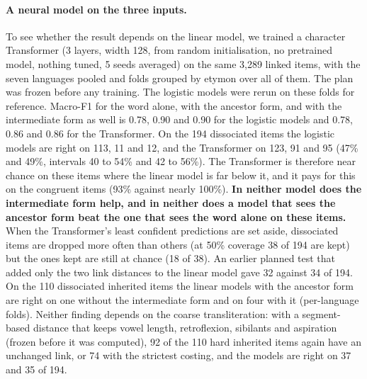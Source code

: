 \documentclass[11pt]{article}
\begin{document}
\paragraph{A neural model on the three inputs.} To see whether the result depends on the linear model, we trained a character Transformer (3 layers, width 128, from random initialisation, no pretrained model, nothing tuned, 5 seeds averaged) on the same 3,289 linked items, with the seven languages pooled and folds grouped by etymon over all of them. The plan was frozen before any training. The logistic models were rerun on these folds for reference. Macro-F1 for the word alone, with the ancestor form, and with the intermediate form as well is 0.78, 0.90 and 0.90 for the logistic models and 0.78, 0.86 and 0.86 for the Transformer. On the 194 dissociated items the logistic models are right on 113, 11 and 12, and the Transformer on 123, 91 and 95 (47\% and 49\%, intervals 40 to 54\% and 42 to 56\%). The Transformer is therefore near chance on these items where the linear model is far below it, and it pays for this on the congruent items (93\% against nearly 100\%). \textbf{In neither model does the intermediate form help, and in neither does a model that sees the ancestor form beat the one that sees the word alone on these items.} When the Transformer's least confident predictions are set aside, dissociated items are dropped more often than others (at 50\% coverage 38 of 194 are kept) but the ones kept are still at chance (18 of 38). An earlier planned test that added only the two link distances to the linear model gave 32 against 34 of 194. On the 110 dissociated inherited items the linear models with the ancestor form are right on one without the intermediate form and on four with it (per-language folds). Neither finding depends on the coarse transliteration: with a segment-based distance that keeps vowel length, retroflexion, sibilants and aspiration (frozen before it was computed), 92 of the 110 hard inherited items again have an unchanged link, or 74 with the strictest costing, and the models are right on 37 and 35 of 194.
\end{document}
